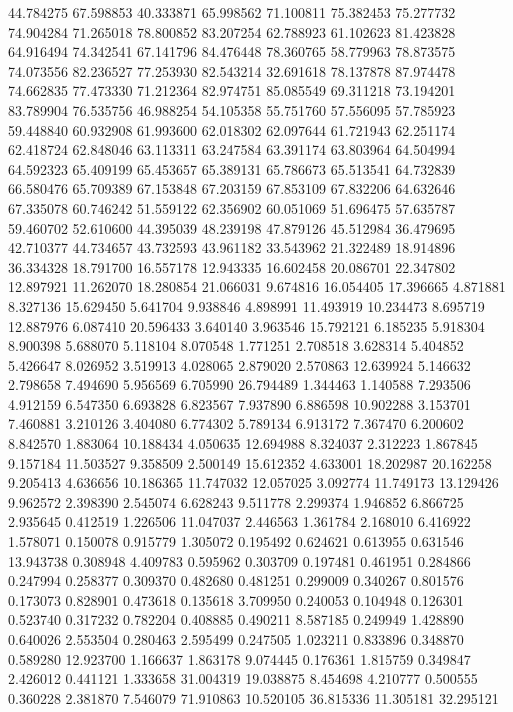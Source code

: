 44.784275
67.598853
40.333871
65.998562
71.100811
75.382453
75.277732
74.904284
71.265018
78.800852
83.207254
62.788923
61.102623
81.423828
64.916494
74.342541
67.141796
84.476448
78.360765
58.779963
78.873575
74.073556
82.236527
77.253930
82.543214
32.691618
78.137878
87.974478
74.662835
77.473330
71.212364
82.974751
85.085549
69.311218
73.194201
83.789904
76.535756
46.988254
54.105358
55.751760
57.556095
57.785923
59.448840
60.932908
61.993600
62.018302
62.097644
61.721943
62.251174
62.418724
62.848046
63.113311
63.247584
63.391174
63.803964
64.504994
64.592323
65.409199
65.453657
65.389131
65.786673
65.513541
64.732839
66.580476
65.709389
67.153848
67.203159
67.853109
67.832206
64.632646
67.335078
60.746242
51.559122
62.356902
60.051069
51.696475
57.635787
59.460702
52.610600
44.395039
48.239198
47.879126
45.512984
36.479695
42.710377
44.734657
43.732593
43.961182
33.543962
21.322489
18.914896
36.334328
18.791700
16.557178
12.943335
16.602458
20.086701
22.347802
12.897921
11.262070
18.280854
21.066031
9.674816
16.054405
17.396665
4.871881
8.327136
15.629450
5.641704
9.938846
4.898991
11.493919
10.234473
8.695719
12.887976
6.087410
20.596433
3.640140
3.963546
15.792121
6.185235
5.918304
8.900398
5.688070
5.118104
8.070548
1.771251
2.708518
3.628314
5.404852
5.426647
8.026952
3.519913
4.028065
2.879020
2.570863
12.639924
5.146632
2.798658
7.494690
5.956569
6.705990
26.794489
1.344463
1.140588
7.293506
4.912159
6.547350
6.693828
6.823567
7.937890
6.886598
10.902288
3.153701
7.460881
3.210126
3.404080
6.774302
5.789134
6.913172
7.367470
6.200602
8.842570
1.883064
10.188434
4.050635
12.694988
8.324037
2.312223
1.867845
9.157184
11.503527
9.358509
2.500149
15.612352
4.633001
18.202987
20.162258
9.205413
4.636656
10.186365
11.747032
12.057025
3.092774
11.749173
13.129426
9.962572
2.398390
2.545074
6.628243
9.511778
2.299374
1.946852
6.866725
2.935645
0.412519
1.226506
11.047037
2.446563
1.361784
2.168010
6.416922
1.578071
0.150078
0.915779
1.305072
0.195492
0.624621
0.613955
0.631546
13.943738
0.308948
4.409783
0.595962
0.303709
0.197481
0.461951
0.284866
0.247994
0.258377
0.309370
0.482680
0.481251
0.299009
0.340267
0.801576
0.173073
0.828901
0.473618
0.135618
3.709950
0.240053
0.104948
0.126301
0.523740
0.317232
0.782204
0.408885
0.490211
8.587185
0.249949
1.428890
0.640026
2.553504
0.280463
2.595499
0.247505
1.023211
0.833896
0.348870
0.589280
12.923700
1.166637
1.863178
9.074445
0.176361
1.815759
0.349847
2.426012
0.441121
1.333658
31.004319
19.038875
8.454698
4.210777
0.500555
0.360228
2.381870
7.546079
71.910863
10.520105
36.815336
11.305181
32.295121
